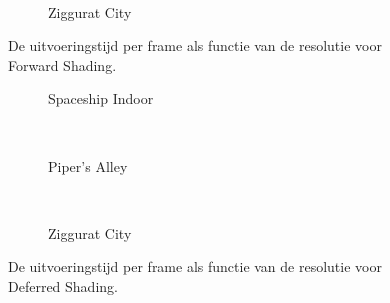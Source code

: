 \begin{figure}[t]
\begin{minipage}[t]{0.5\textwidth}
\begin{adjustbox}{minipage=\textwidth, scale=0.55}
  \end{adjustbox} \\
  \begin{adjustbox}{minipage=\textwidth, scale=0.55}
    \begin{subfigure}[b]{1.6\textwidth}
      \centering
      \def\svgwidth{\textwidth}
      
      \caption{Ziggurat City}
      \label{fig:hs-compare-resolution:forward:city}
    \end{subfigure}
  \end{adjustbox}
  \caption{\small De uitvoeringstijd per frame als functie van de resolutie voor Forward Shading.}
  \label{fig:hs-compare-resolution:forward}
  \end{minipage}%
  \begin{minipage}[t]{0.5\textwidth}
  \begin{adjustbox}{minipage=\textwidth, scale=0.55}
    \begin{subfigure}[b]{1.6\textwidth}
      \centering
      \def\svgwidth{\textwidth}
      
      \caption{Spaceship Indoor}
      \vspace{4pt}
      \label{fig:hs-compare-resolution:deferred:indoor}
    \end{subfigure}
  \end{adjustbox} \\
  \begin{adjustbox}{minipage=\textwidth, scale=0.55}
    \begin{subfigure}[b]{1.6\textwidth}
      \centering
      \def\svgwidth{\textwidth}
      
      \caption{Piper's Alley}
      \vspace{4pt}
      \label{fig:hs-compare-resolution:deferred:alley}
    \end{subfigure}
  \end{adjustbox} \\
  \begin{adjustbox}{minipage=\textwidth, scale=0.55}
    \begin{subfigure}[b]{1.6\textwidth}
      \centering
      \def\svgwidth{\textwidth}
      
      \caption{Ziggurat City}
      \label{fig:hs-compare-resolution:deferred:city}
    \end{subfigure}
  \end{adjustbox}
  \caption{\small De uitvoeringstijd per frame als functie van de resolutie voor Deferred Shading.}
  \label{fig:hs-compare-resolution:deferred}
  \end{minipage} 
\end{figure}
